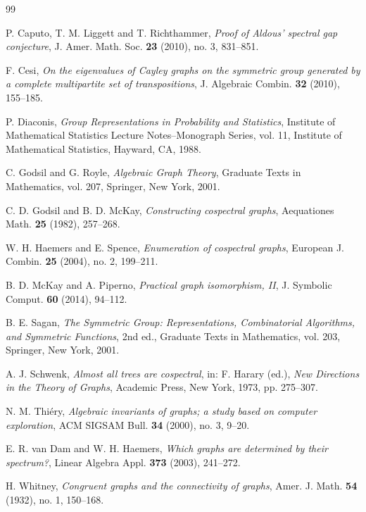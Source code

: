 \documentclass{amsart}
\theoremstyle{definition}
\begin{document}
\begin{thebibliography}{99}

P. Caputo, T. M. Liggett and T. Richthammer,
\emph{Proof of Aldous' spectral gap conjecture},
J. Amer. Math. Soc. \textbf{23} (2010), no. 3, 831--851.

F. Cesi,
\emph{On the eigenvalues of Cayley graphs on the symmetric group generated by
a complete multipartite set of transpositions},
J. Algebraic Combin. \textbf{32} (2010), 155--185.

P. Diaconis,
\emph{Group Representations in Probability and Statistics},
Institute of Mathematical Statistics Lecture Notes--Monograph Series, vol. 11,
Institute of Mathematical Statistics, Hayward, CA, 1988.

C. Godsil and G. Royle,
\emph{Algebraic Graph Theory},
Graduate Texts in Mathematics, vol. 207, Springer, New York, 2001.

C. D. Godsil and B. D. McKay,
\emph{Constructing cospectral graphs},
Aequationes Math. \textbf{25} (1982), 257--268.

W. H. Haemers and E. Spence,
\emph{Enumeration of cospectral graphs},
European J. Combin. \textbf{25} (2004), no. 2, 199--211.

B. D. McKay and A. Piperno,
\emph{Practical graph isomorphism, II},
J. Symbolic Comput. \textbf{60} (2014), 94--112.

B. E. Sagan,
\emph{The Symmetric Group: Representations, Combinatorial Algorithms, and Symmetric Functions},
2nd ed., Graduate Texts in Mathematics, vol. 203, Springer, New York, 2001.

A. J. Schwenk,
\emph{Almost all trees are cospectral},
in: F. Harary (ed.), \emph{New Directions in the Theory of Graphs},
Academic Press, New York, 1973, pp. 275--307.

N. M. Thi\'ery,
\emph{Algebraic invariants of graphs; a study based on computer exploration},
ACM SIGSAM Bull. \textbf{34} (2000), no. 3, 9--20.

E. R. van Dam and W. H. Haemers,
\emph{Which graphs are determined by their spectrum?},
Linear Algebra Appl. \textbf{373} (2003), 241--272.

H. Whitney,
\emph{Congruent graphs and the connectivity of graphs},
Amer. J. Math. \textbf{54} (1932), no. 1, 150--168.

\end{thebibliography}
\end{document}
